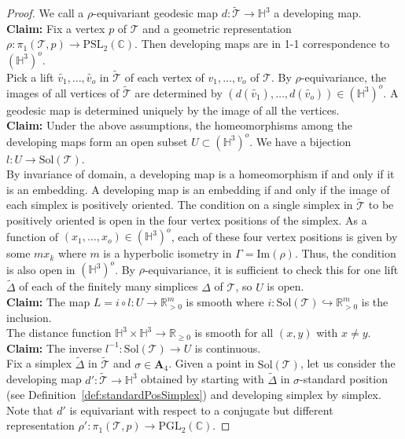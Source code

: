 \documentclass[utopia,fullpage]{nmd/article}
\newcommand{\negSpace}{\!}
\newcommand\C{\mathbb C}
\newcommand\R{\mathbb R}
\renewcommand\H{\mathbb H}
\newcommand{\negSpace}{}
\newcommand\myPGL[2]{\mathrm{PGL}_{#1}(#2)}
\newcommand\myPSL[2]{\mathrm{PSL}_{#1}(#2)}
\newcommand\trig{\mathcal{T}}
\newcommand\permA{\mathbf{A}}
\newcommand\edgeEqSol{\mathrm{Sol}}
\begin{document}
\begin{proof} We call a $\rho$-equivariant geodesic map $d:\tilde{\trig}\to\H^3$ a developing map.\\
{\bf Claim:} Fix a vertex $p$ of $\trig\negSpace{}$ and a geometric representation $\rho:\pi_1(\trig\negSpace{},p)\to\myPSL{2}{\C}$. Then developing maps are in 1-1 correspondence to $(\H^3)^o$.\\
Pick a lift $\tilde{v_1},\dots, \tilde{v_o}$ in $\tilde{\trig}\negSpace{}$ of each vertex of $v_1,\dots,v_o$ of $\trig\negSpace{}$. By $\rho$-equivariance, the images of all vertices of $\tilde{\trig}$ are determined by $(d(\tilde{v_1}), \dots, d(\tilde{v_o}))\in(\H^3)^o$. A geodesic map is determined uniquely by the image of all the vertices.\\
{\bf Claim:} Under the above assumptions, the homeomorphisms among the developing maps form an open subset $U\subset(\H^3)^o$. We have a bijection $l:U\to\edgeEqSol(\trig)$.\\
By invariance of domain, a developing map is a homeomorphism if and only if it is an embedding. A developing map is an embedding if and only if the image of each simplex is positively oriented. The condition on a single simplex in $\tilde{\trig}\negSpace$ to be positively oriented is open in the four vertex positions of the simplex. As a function of $(x_1,\dots,x_o)\in (\H^3)^o$, each of these four vertex positions is given by some $m x_k$ where $m$ is a hyperbolic isometry in $\Gamma=\mathrm{Im}(\rho)$. Thus, the condition is also open in $(\H^3)^o$. By $\rho$-equivariance, it is sufficient to check this for one lift $\tilde{\Delta}$ of each of the finitely many simplices $\Delta$ of $\trig\negSpace{}$, so $U$ is open.\\
{\bf Claim:} The map $L=i\circ l: U\to\R^m_{>0}$ is smooth where $i: \edgeEqSol(\trig)\hookrightarrow \R^m_{>0}$ is the inclusion.\\
The distance function $\H^3\times\H^3\to\R_{\geq 0}$ is smooth for all $(x,y)$ with $x\not= y$.\\
{\bf Claim:} The inverse $l^{-1}:\edgeEqSol(\trig)\to U$ is continuous.\\
Fix a simplex $\tilde{\Delta}$ in $\tilde{\trig}$ and $\sigma\in \permA_4$. Given a point in $\edgeEqSol(\trig)$, let us consider the developing map $d':\tilde{\trig}\to\H^3$ obtained by starting with $\tilde{\Delta}$ in $\sigma$-standard position (see Definition~\ref{def:standardPosSimplex}) and developing simplex by simplex.
Note that $d'$ is equivariant with respect to a conjugate but different representation $\rho':\pi_1(\trig\negSpace{}, p)\to\myPGL{2}{\C}$.

\end{proof}
\end{document}

